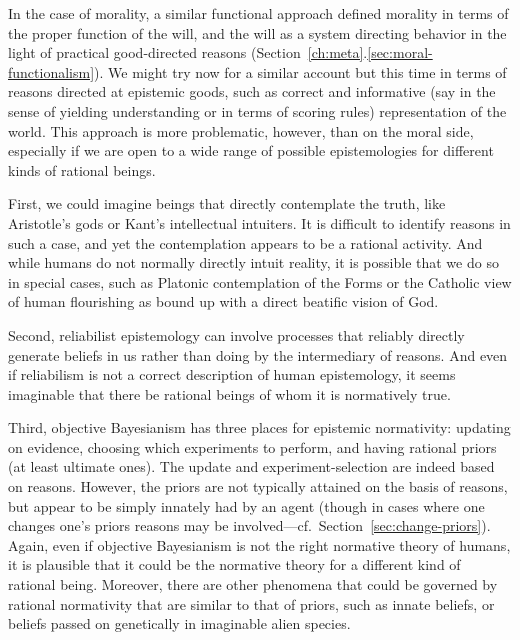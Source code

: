 In the case of morality, a similar functional approach defined morality in terms of the proper function of the will,
and the will as a system directing behavior in the light of practical good-directed reasons (Section~\ref{ch:meta}.\ref{sec:moral-functionalism}). We might try now for
a similar account but this time in terms of reasons directed at epistemic goods, such as correct and informative 
(say in the sense of yielding understanding or in terms of scoring rules) representation of the world.
This approach is more problematic, however, than on the moral side, especially if we are open to a wide range of 
possible epistemologies for different kinds of rational beings.

First, we could imagine beings that directly contemplate the truth, like Aristotle's gods or Kant's intellectual
intuiters. It is difficult to identify reasons in such a case, and yet the contemplation appears to be a rational
activity. And while humans do not normally directly intuit reality, it is possible that we do so in special cases,
such as Platonic contemplation of the Forms or the Catholic view of human flourishing as bound up with a direct beatific
vision of God. 

Second, reliabilist epistemology can involve processes that reliably directly generate beliefs in us rather than 
doing by the intermediary of reasons. And even if reliabilism is not a correct description of human epistemology,
it seems imaginable that there be rational beings of whom it is normatively true.

Third, objective Bayesianism has three places for epistemic normativity: updating on evidence, choosing which 
experiments to perform, and having rational priors (at least ultimate ones). The update and experiment-selection are indeed based on 
reasons. However, the priors are not typically attained on the basis of reasons, but appear to be simply innately 
had by an agent (though in cases where one changes one's priors reasons may be involved---cf.\ Section~\ref{sec:change-priors}). Again, even if objective 
Bayesianism is not the right normative theory of humans, it is plausible that it could be the normative theory for 
a different kind of rational being. Moreover, there are other phenomena that could be governed by rational 
normativity that are similar to that of priors, such as innate beliefs, or beliefs passed on genetically in 
imaginable alien species. 

